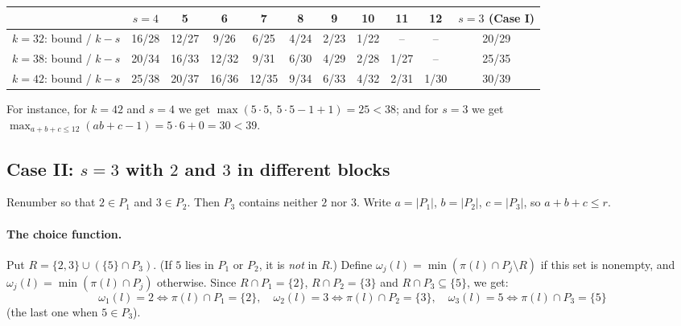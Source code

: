 \documentclass[11pt]{article}
\theoremstyle{definition}
\theoremstyle{remark}
\begin{document}
\begin{center}\small\setlength{\tabcolsep}{3pt}
\begin{tabular}{c|ccccccccc|c}
 & $s=4$&5&6&7&8&9&10&11&12& $s=3$ (Case I)\\\hline
$k=32$: bound / $k-s$ & 16/28&12/27&9/26&6/25&4/24&2/23&1/22&--&--& 20/29\\
$k=38$: bound / $k-s$ & 20/34&16/33&12/32&9/31&6/30&4/29&2/28&1/27&--& 25/35\\
$k=42$: bound / $k-s$ & 25/38&20/37&16/36&12/35&9/34&6/33&4/32&2/31&1/30& 30/39
\end{tabular}
\end{center}
For instance, for $k=42$ and $s=4$ we get $\max(5\cdot5,\ 5\cdot5-1+1)=25<38$; and for $s=3$ we get
$\max_{a+b+c\le12}(ab+c-1)=5\cdot6+0=30<39$.

\subsection*{Case II: $s=3$ with $2$ and $3$ in different blocks}

Renumber so that $2\in P_1$ and $3\in P_2$. Then $P_3$ contains neither $2$ nor $3$. Write
$a=|P_1|$, $b=|P_2|$, $c=|P_3|$, so $a+b+c\le r$.

\paragraph{The choice function.} Put $R=\{2,3\}\cup(\{5\}\cap P_3)$. (If $5$ lies in $P_1$ or
$P_2$, it is \emph{not} in $R$.) Define $\omega_j(l)=\min(\pi(l)\cap P_j\setminus R)$ if this set
is nonempty, and $\omega_j(l)=\min(\pi(l)\cap P_j)$ otherwise. Since $R\cap P_1=\{2\}$,
$R\cap P_2=\{3\}$ and $R\cap P_3\subseteq\{5\}$, we get:
\begin{equation}\label{eq:rule}
  \omega_1(l)=2\iff\pi(l)\cap P_1=\{2\},\quad
  \omega_2(l)=3\iff\pi(l)\cap P_2=\{3\},\quad
  \omega_3(l)=5\iff\pi(l)\cap P_3=\{5\}
\end{equation}
(the last one when $5\in P_3$).
\end{document}
